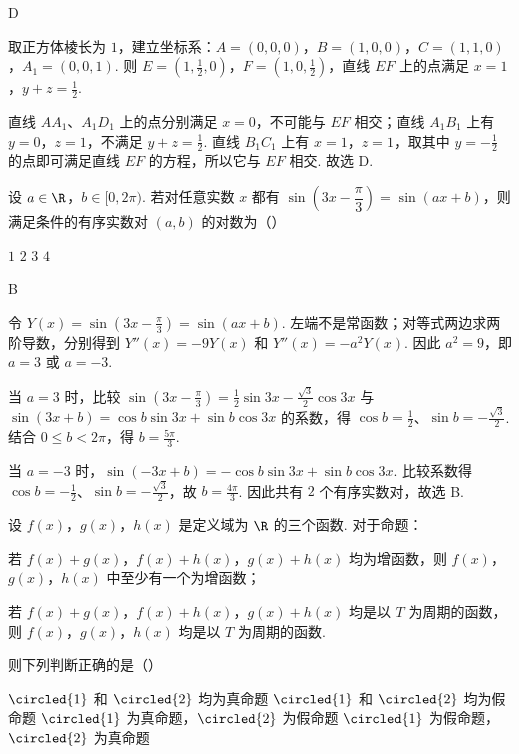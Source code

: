 \begin{answer}
D
\end{answer}

\begin{solution}
取正方体棱长为 \(1\)，建立坐标系：\(A=(0,0,0)\)，\(B=(1,0,0)\)，\(C=(1,1,0)\)，\(A_1=(0,0,1)\). 则 \(E=(1,\frac12,0)\)，\(F=(1,0,\frac12)\)，直线 \(EF\) 上的点满足 \(x=1\)，\(y+z=\frac12\).

直线 \(AA_1\)、\(A_1D_1\) 上的点分别满足 \(x=0\)，不可能与 \(EF\) 相交；直线 \(A_1B_1\) 上有 \(y=0\)，\(z=1\)，不满足 \(y+z=\frac12\). 直线 \(B_1C_1\) 上有 \(x=1\)，\(z=1\)，取其中 \(y=-\frac12\) 的点即可满足直线 \(EF\) 的方程，所以它与 \(EF\) 相交. 故选 D.
\end{solution}

\begin{problem}
设 \(a\in\R\)，\(b\in[0,2\pi)\). 若对任意实数 \(x\) 都有 \(\sin\!\left(3x-\dfrac{\pi}{3}\right)=\sin(ax+b)\)，则满足条件的有序实数对 \((a,b)\) 的对数为（\quad）

\choices
    {\(1\)}
    {\(2\)}
    {\(3\)}
    {\(4\)}
\end{problem}

\begin{answer}
B
\end{answer}

\begin{solution}
令 \(Y(x)=\sin\left(3x-\frac\pi3\right)=\sin(ax+b)\). 左端不是常函数；对等式两边求两阶导数，分别得到 \(Y''(x)=-9Y(x)\) 和 \(Y''(x)=-a^2Y(x)\). 因此 \(a^2=9\)，即 \(a=3\) 或 \(a=-3\).

当 \(a=3\) 时，比较
\(\sin\left(3x-\frac\pi3\right)=\frac12\sin3x-\frac{\sqrt3}{2}\cos3x\)
与
\(\sin(3x+b)=\cos b\sin3x+\sin b\cos3x\)
的系数，得 \(\cos b=\frac12\)、\(\sin b=-\frac{\sqrt3}{2}\). 结合 \(0\leqslant b<2\pi\)，得 \(b=\frac{5\pi}{3}\).

当 \(a=-3\) 时，\(\sin(-3x+b)=-\cos b\sin3x+\sin b\cos3x\). 比较系数得 \(\cos b=-\frac12\)、\(\sin b=-\frac{\sqrt3}{2}\)，故 \(b=\frac{4\pi}{3}\). 因此共有 \(2\) 个有序实数对，故选 B.
\end{solution}

\begin{problem}
设 \(f(x)\)，\(g(x)\)，\(h(x)\) 是定义域为 \(\R\) 的三个函数. 对于命题：
\begin{circlelist}
\item 若 \(f(x)+g(x)\)，\(f(x)+h(x)\)，\(g(x)+h(x)\) 均为增函数，则 \(f(x)\)，\(g(x)\)，\(h(x)\) 中至少有一个为增函数；
\item 若 \(f(x)+g(x)\)，\(f(x)+h(x)\)，\(g(x)+h(x)\) 均是以 \(T\) 为周期的函数，则 \(f(x)\)，\(g(x)\)，\(h(x)\) 均是以 \(T\) 为周期的函数.
\end{circlelist}
则下列判断正确的是（\quad）

\choices
    {\(\circled{1}\) 和 \(\circled{2}\) 均为真命题}
    {\(\circled{1}\) 和 \(\circled{2}\) 均为假命题}
    {\(\circled{1}\) 为真命题，\(\circled{2}\) 为假命题}
    {\(\circled{1}\) 为假命题，\(\circled{2}\) 为真命题}
\end{problem}

